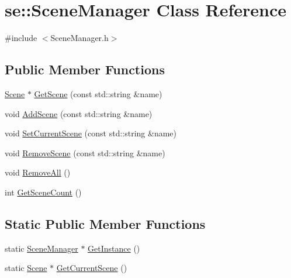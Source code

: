 \hypertarget{classse_1_1_scene_manager}{}\section{se\+:\+:Scene\+Manager Class Reference}
\label{classse_1_1_scene_manager}


{\ttfamily \#include $<$Scene\+Manager.\+h$>$}

\subsection*{Public Member Functions}
\begin{DoxyCompactItemize}
\item 
\mbox{\hyperlink{classse_1_1_scene}{Scene}} $\ast$ \mbox{\hyperlink{classse_1_1_scene_manager_a07360d102e47455f497c844d7ad36ecb}{Get\+Scene}} (const std\+::string \&name)
\item 
void \mbox{\hyperlink{classse_1_1_scene_manager_a9ad26f193f547285f4eae5c440f24a10}{Add\+Scene}} (const std\+::string \&name)
\item 
void \mbox{\hyperlink{classse_1_1_scene_manager_a8eff0a05036942247f81fe4915ffce50}{Set\+Current\+Scene}} (const std\+::string \&name)
\item 
void \mbox{\hyperlink{classse_1_1_scene_manager_a7912dae18fcbfff00194a63b88aec179}{Remove\+Scene}} (const std\+::string \&name)
\item 
void \mbox{\hyperlink{classse_1_1_scene_manager_a354707c12a744c1f86e9433b312f8203}{Remove\+All}} ()
\item 
int \mbox{\hyperlink{classse_1_1_scene_manager_aac6929d7dfd933c4d40fbf66b3740321}{Get\+Scene\+Count}} ()
\end{DoxyCompactItemize}
\subsection*{Static Public Member Functions}
\begin{DoxyCompactItemize}
\item 
static \mbox{\hyperlink{classse_1_1_scene_manager}{Scene\+Manager}} $\ast$ \mbox{\hyperlink{classse_1_1_scene_manager_a670006ca4d20028e0778074e94fa0640}{Get\+Instance}} ()
\item 
static \mbox{\hyperlink{classse_1_1_scene}{Scene}} $\ast$ \mbox{\hyperlink{classse_1_1_scene_manager_a79b72ff927600fa9ef24f1dae177b566}{Get\+Current\+Scene}} ()
\end{DoxyCompactItemize}


